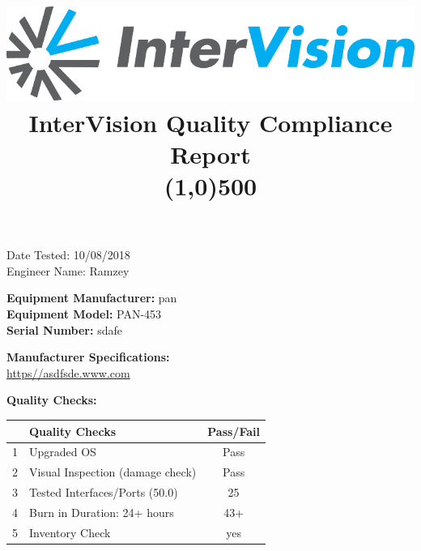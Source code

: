 \documentclass[12pt]{article}
\author{}
\title{\includegraphics[scale=1]{IV_logo.png}
\\InterVision Quality Compliance Report\\\line(1,0){500}\vspace{-8ex}}
\date{}
\begin{document}
\maketitle
\begin{flushright}
Date Tested: 10/08/2018\\
Engineer Name: Ramzey\\
\end{flushright}
\begin{flushleft}
\textbf{Equipment Manufacturer: } pan\\
\textbf{Equipment Model: } PAN-453\\
\textbf{Serial Number: } sdafe\\
\end{flushleft}
\begin{flushleft}
\textbf{Manufacturer Specifications:} \\\url{https//asdfsde.www.com} \\
\end{flushleft}
\begin{flushleft}
\textbf{Quality Checks:} 
\end{flushleft}
\begin{table}[H]
\centering
\begin{tabular}{|c|l|c|}
 \hline
& \textbf{Quality Checks}  & \textbf{Pass/Fail} \\ \hline
1& Upgraded OS & Pass \\ \hline
2& Visual Inspection (damage check) & Pass \\ \hline
3& Tested Interfaces/Ports (50.0) & 25 \\ \hline
4& Burn in Duration: 24+ hours & 43+ \\ \hline
5& Inventory Check & yes \\ \hline
\end{tabular}
\end{table}
\end{document}
